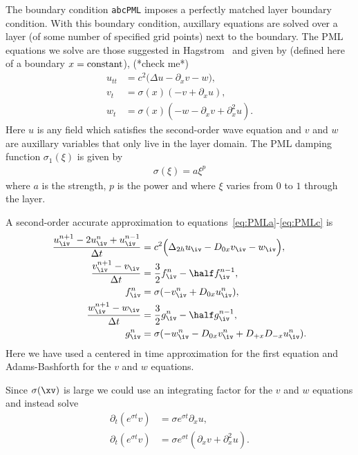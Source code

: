 \documentclass{article}
\begin{document}
The boundary condition {\tt abcPML} imposes a perfectly matched layer boundary condition.
With this boundary condition, auxillary equations are solved over a layer (of some number of
specified grid points) next to the boundary. The PML equations we solve
are those suggested in Hagstrom~\cite{Hagstrom1999} and given by (defined here of a boundary $x={\rm constant}$), (*check me*)
\begin{align}
  u_{tt} &= c^2 \Big( \Delta u - \partial_x v - w \Big), \label{eq:PMLa} \\
   v_t &= \sigma(x)( -v + \partial_x u ) , \\
   w_t &= \sigma(x) ( -w  - \partial_x v + \partial_x^2 u ). \label{eq:PMLc}
\end{align}
Here $u$ is any field which satisfies the second-order wave equation and $v$ and $w$ are auxillary variables
that only live in the layer domain. 
The PML damping function $\sigma_1(\xi)$ is given by 
\begin{align}
  \sigma(\xi) = a \xi^p
\end{align}
where $a$ is the strength, $p$ is the power and where $\xi$ varies from $0$ to $1$ through the layer.



A second-order accurate approximation to equations~\eqref{eq:PMLa}-\eqref{eq:PMLc} is
\begin{align}
  {u_\iv^{n+1} - 2 u_\iv^n + u_\iv^{n-1} \over \dt} &= c^2 \Big( \Delta_{2h} u_\iv - D_{0x} v_\iv  - w_\iv \Big), \label{eq:PMLorder2a}\\
  {v_\iv^{n+1} - v_\iv \over \dt} &= \frac{3}{2} f_\iv^{n} - \half f_\iv^{n-1} , \\
  f_\iv^n  &= \sigma ( -v_\iv^n + D_{0x} u_\iv^n ) , \\
  {w_\iv^{n+1} - w_\iv \over \dt} &= \frac{3}{2} g_\iv^{n} - \half g_\iv^{n-1} , \\
  g_\iv^n  &= \sigma ( -w_\iv^n  - D_{0x} v_\iv^n + D_{+x}D_{-x} u_\iv^n ).   \label{eq:PMLorder2e}
\end{align}
Here we have used a centered in time approximation for the first equation and Adams-Bashforth for the $v$ and $w$ equations.

 Since $\sigma(\xv)$ is large we could use an integrating factor for the $v$ and $w$ equations
and instead solve 
\begin{align}
  \partial_t( e^{\sigma t} v) &= \sigma  e^{\sigma t} \partial_x u  , \\
   \partial_t( e^{\sigma t} v) &= \sigma e^{\sigma t} ( \partial_x v + \partial_x^2 u ). 
\end{align}
\end{document}
